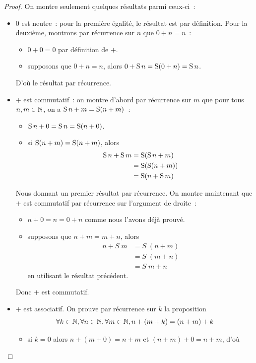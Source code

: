 \begin{proof}
  On montre seulement quelques résultats parmi ceux-ci~:
  \begin{itemize}
  \item $0$ est neutre~: pour la première égalité, le résultat est par
    définition. Pour la deuxième, montrons par récurrence sur $n$ que
    $0+n = n$~:
    \begin{itemize}
    \item $0 + 0 = 0$ par définition de $+$.
    \item supposons que $0+n = n$, alors $0+\operatorname{S} n = \operatorname{S}(0+n) = \operatorname{S} n$.
    \end{itemize}
    D'où le résultat par récurrence.
  \item $+$ est commutatif~: on montre d'abord par récurrence sur $m$ que pour
    tous $n,m\in\mathbb N$, on a $\operatorname{S} n+m = \operatorname{S} (n+m)$~:
    \begin{itemize}
    \item $\operatorname{S} n+0=\operatorname{S} n = \operatorname{S}(n+0)$.
    \item si $\operatorname{S} (n+m) = \operatorname{S}(n+m)$, alors
      \begin{align*}
        \operatorname{S} n+\operatorname{S} m &= \operatorname{S}(\operatorname{S} n+m)\\
        &= \operatorname{S}(\operatorname{S}(n+m))\\
        &= \operatorname{S}(n+\operatorname{S} m)
      \end{align*}
    \end{itemize}
    Nous donnant un premier résultat par récurrence. On montre maintenant que
    $+$ est commutatif par récurrence sur l'argument de droite~:
    \begin{itemize}
    \item $n+0 = n = 0+n$ comme nous l'avons déjà prouvé.
    \item supposons que $n+m = m+n$, alors
      \begin{align*}
        n + S\;m &= S\;(n+m)\\
        &= S\;(m+n)\\
        &= S\;m + n
      \end{align*}
      en utilisant le résultat précédent.
    \end{itemize}
    Donc $+$ est commutatif.
  \item $+$ est associatif. On prouve par récurrence sur $k$ la proposition
    \[\forall k\in\mathbb N,\forall n\in\mathbb N,\forall m\in\mathbb N,n+(m+k)=(n+m)+k\]
    \begin{itemize}
    \item si $k = 0$ alors $n + (m + 0) = n + m$ et $(n+m)+0=n+m$, d'où

\end{itemize}
\end{itemize}
\end{proof}
